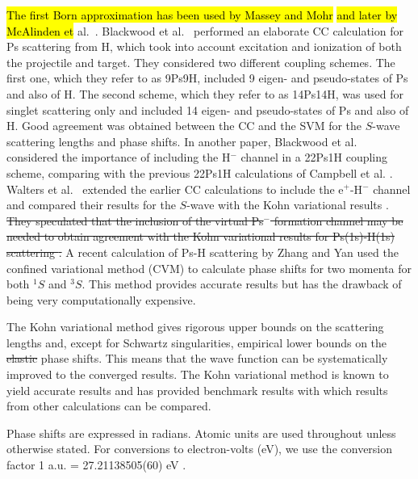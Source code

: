 \documentclass[preprint,showpacs,showkeys,preprintnumbers,amsmath,amssymb,longbibliography,pra,aps]{revtex4-1}
\newcommand{\todoi}{\todo[inline]}
\begin{document}
\hl{The first Born approximation has been used by Massey and Mohr} \cite{Massey1954}
\hl{and later by McAlinden et} al.~\cite{McAlinden1996}.
Blackwood et al.~\cite{Blackwood2002} performed an elaborate CC calculation 
for Ps scattering from H, which took into account excitation and ionization 
of both the projectile and target. They considered two different coupling 
schemes. The first one, which they refer to as 9Ps9H, included 9 eigen- and 
pseudo-states of Ps and also of H. The second scheme, which they refer to as 
14Ps14H, was used for singlet scattering only and included 14 eigen- and pseudo-states of 
Ps and also of H. Good agreement was obtained between the CC
\cite{Blackwood2002} and the SVM \cite{Ivanov2002} for the $S$-wave scattering
lengths and phase shifts. In another paper, Blackwood et
al.~\cite{Blackwood2002b} considered the importance of including the H$^-$
channel in a 22Ps1H coupling scheme, comparing with the previous 22Ps1H
calculations of Campbell et al. \cite{Campbell1998}. Walters et
al.~\cite{Walters2004} extended the earlier CC calculations
\cite{Blackwood2002} to include the e$^+$-H$^-$ channel
\cite{Blackwood2002b} and compared their results for the $S$-wave with the
Kohn variational results \cite{VanReeth2003}. \sout{They speculated that the
inclusion of the virtual Ps$^-$ formation channel may be needed to obtain 
agreement with the Kohn variational results for Ps(1s)-H(1s) scattering 
\cite{Blackwood2002}.} A recent calculation of Ps-H scattering by Zhang and Yan
\cite{Zhang2012} used the
confined variational method (CVM) to calculate phase shifts for two momenta
for both $^1S$ and $^3S$. This method provides accurate
results but has the drawback of being very computationally expensive.

The Kohn variational method gives rigorous upper bounds on the scattering lengths
and, except for Schwartz singularities, empirical lower bounds on the \sout{elastic}
phase shifts. This means that the wave 
function can be systematically improved to the converged results. The Kohn 
variational method is known to yield accurate results and has provided 
benchmark results \cite{VanReeth2003,VanReeth2004} with which results from 
other calculations can be compared.

Phase shifts are expressed in radians. Atomic units are used throughout 
unless otherwise stated. For conversions to electron-volts (eV), we use the 
conversion factor 1 a.u. = {27.21138505(60) eV}
\cite{Mohr2012,*NISTConversions}.

\end{document}
